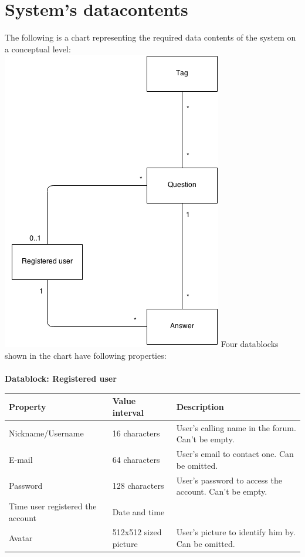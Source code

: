 \documentclass[a4paper,12pt]{article}
\begin{document}
\section{System's datacontents}
The following is a chart representing the required data contents of the system on a conceptual level:\\
\includegraphics{ConceptChart}
\newpage
\noindent Four datablocks shown in the chart have following properties:\\
\\
\textbf{Datablock: Registered user}
\begin{center}
    \begin{tabular}{ | p{4cm} | p{3cm} | p{5cm} |}
    \hline
    Property & Value interval & Description \\ \hline
    Nickname/Username & 16 characters & User's calling name in the forum. Can't be empty. \\ \hline
    E-mail & 64 characters & User's email to contact one. Can be omitted. \\ \hline
    Password & 128 characters & User's password to access the account. Can't be empty. \\
    \hline
    Time user registered the account & Date and time &  \\
    \hline
    Avatar & 512x512 sized picture & User's picture to identify him by. Can be omitted. \\
    \hline
    \end{tabular}
\end{center}
\end{document}
